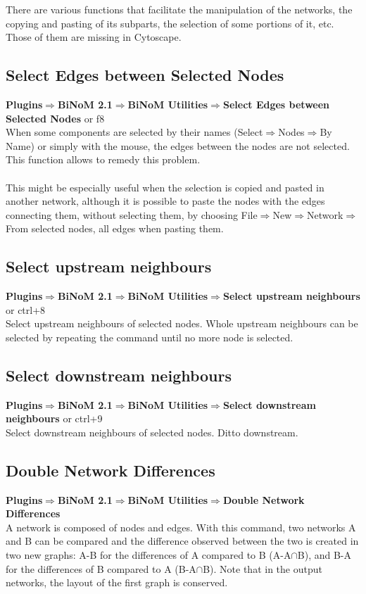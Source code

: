 There are various functions that facilitate the manipulation of the networks, the copying and pasting of its subparts, the selection of some portions of it, etc. Those of them are missing in Cytoscape.
\subsection{Select Edges between Selected Nodes}
\textbf{Plugins$\Rightarrow$BiNoM 2.1$\Rightarrow$BiNoM Utilities$\Rightarrow$Select Edges between Selected Nodes} or f8\\
When some components are selected by their names (Select$\Rightarrow$Nodes$\Rightarrow$By Name) or simply with the mouse, the edges between the nodes are not selected. This function allows to remedy this problem.\\\\
This might be especially useful when the selection is copied and pasted in another network, although it is possible to paste the nodes with the edges connecting them, without selecting them, by choosing File$\Rightarrow$New$\Rightarrow$Network$\Rightarrow$From selected nodes, all edges when pasting them.

\subsection{Select upstream neighbours}
\textbf{Plugins$\Rightarrow$BiNoM 2.1$\Rightarrow$BiNoM Utilities$\Rightarrow$Select upstream neighbours} or ctrl+8\\
Select upstream neighbours of selected nodes. Whole upstream neighbours can be selected by repeating the command until no more node is selected.

\subsection{Select downstream neighbours}
\textbf{Plugins$\Rightarrow$BiNoM 2.1$\Rightarrow$BiNoM Utilities$\Rightarrow$Select downstream neighbours} or ctrl+9\\
Select downstream neighbours of selected nodes. Ditto downstream.

\subsection{Double Network Differences}
\textbf{Plugins$\Rightarrow$BiNoM 2.1$\Rightarrow$BiNoM Utilities$\Rightarrow$Double Network Differences}\\
A network is composed of nodes and edges. With this command, two networks A and B can be compared and the difference observed between the two is created in two new graphs: A-B for the differences of A compared to B (A-A$\cap$B), and B-A for the differences of B compared to A (B-A$\cap$B). Note that in the output networks, the layout of the first graph is conserved.

